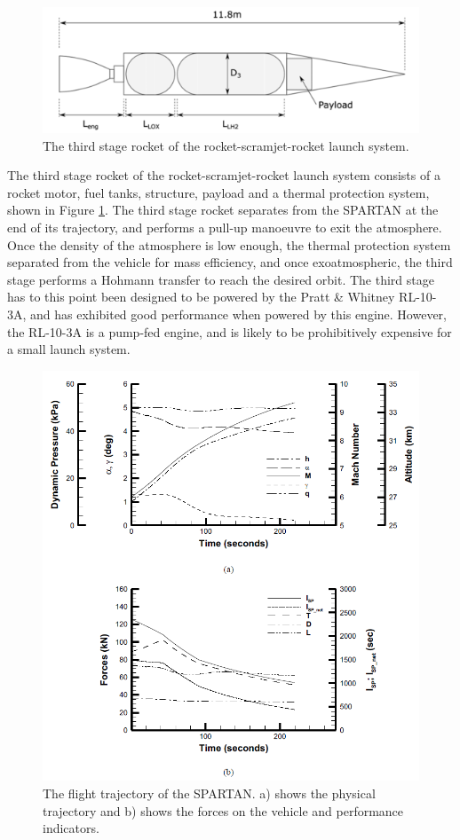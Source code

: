 \begin{figure}[ht]
	\centering
	\includegraphics[width=0.7\linewidth]{figures/2_literature-review/ThirdStage}
	\caption{The third stage rocket of the rocket-scramjet-rocket launch system\cite{Preller2017b}.}
	\label{fig:ThirdStage}
\end{figure}
The third stage rocket of the rocket-scramjet-rocket launch system consists of a rocket motor, fuel tanks, structure, payload and a thermal protection system\cite{Preller2017b}, shown in Figure \ref{fig:ThirdStage}. 
The third stage rocket separates from the SPARTAN at the end of its trajectory, and performs a pull-up manoeuvre to exit the atmosphere. Once the density of the atmosphere is low enough, the thermal protection system separated from the vehicle for mass efficiency, and once exoatmospheric, the third stage performs a Hohmann transfer to reach the desired orbit. 
The third stage has to this point been designed to be powered by the Pratt \& Whitney RL-10-3A\cite{Preller2017b}, and has exhibited good performance when powered by this engine. However, the RL-10-3A is a pump-fed engine, and is likely to be prohibitively expensive for a small launch system. 
 



\begin{figure}[!ht]
	\centering
	\includegraphics[width=0.9\linewidth]{figures/2_literature-review/SPARTAN_traj1}
	\caption{The flight trajectory of the SPARTAN. a) shows the physical trajectory and b) shows the forces on the vehicle and performance indicators.}
	\label{fig:SPARTAN_traj}
\end{figure}

